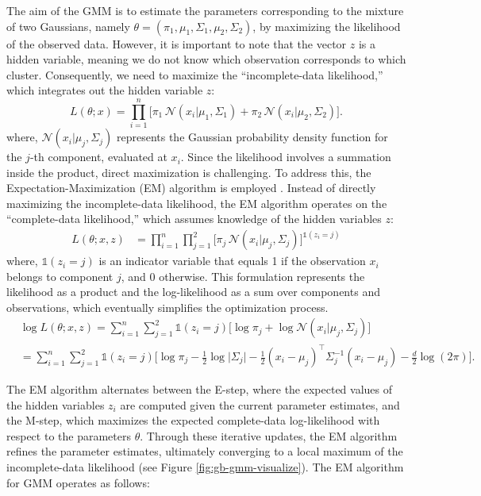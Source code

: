 The aim of the GMM is to estimate the parameters corresponding to the mixture of two Gaussians, namely $\theta = (\pi_1, \mu_1, \Sigma_1, \mu_2, \Sigma_2)$, by maximizing the likelihood of the observed data. However, it is important to note that the vector $z$ is a hidden variable, meaning we do not know which observation corresponds to which cluster. Consequently, we need to maximize the ``incomplete-data likelihood,'' which integrates out the hidden variable $z$:
\begin{equation}
    L(\theta; x) = \prod_{i=1}^n \Big[\pi_1 \, \mathcal{N}(x_i \vert \mu_1, \Sigma_1) + \pi_2 \, \mathcal{N}(x_i \vert \mu_2, \Sigma_2)\Big].
\end{equation}
where, $\mathcal{N}(x_i \vert \mu_j, \Sigma_j)$ represents the Gaussian probability density function for the $j$-th component, evaluated at $x_i$. Since the likelihood involves a summation inside the product, direct maximization is challenging. To address this, the Expectation-Maximization (EM) algorithm is employed \cite{dempster1977maximum}. Instead of directly maximizing the incomplete-data likelihood, the EM algorithm operates on the ``complete-data likelihood,'' which assumes knowledge of the hidden variables $z$:
\begin{align}
    L(\theta; x, z) &= \prod_{i=1}^n \prod_{j=1}^2 \Big[\pi_j \, \mathcal{N}(x_i \vert \mu_j, \Sigma_j)\Big]^{\mathds{1}(z_{i} = j)}
\label{eq:gmm_complete_data1}
\end{align}
where, $\mathds{1}(z_i = j)$ is an indicator variable that equals 1 if the observation $x_i$ belongs to component $j$, and 0 otherwise. This formulation represents the likelihood as a product and the log-likelihood as a sum over components and observations, which eventually simplifies the optimization process.
\begin{align}
    &\log L(\theta; x, z) = \sum_{i=1}^n \sum_{j=1}^2 \mathds{1}(z_{i} = j) 
    \Big[\log \pi_j + \log \mathcal{N}(x_i \vert \mu_j, \Sigma_j)\Big] \nonumber \\
    &= \sum_{i=1}^n \sum_{j=1}^2 \mathds{1}(z_{i} = j) 
    \Big[\log \pi_j - \frac{1}{2} \log \vert\Sigma_j\vert 
    - \frac{1}{2} (x_i - \mu_j)^\top \Sigma_j^{-1} (x_i - \mu_j) 
    - \frac{d}{2} \log(2\pi)\Big].
\label{eq:gmm_complete_data2}
\end{align}

The EM algorithm alternates between the E-step, where the expected values of the hidden variables $z_i$ are computed given the current parameter estimates, and the M-step, which maximizes the expected complete-data log-likelihood with respect to the parameters $\theta$. Through these iterative updates, the EM algorithm refines the parameter estimates, ultimately converging to a local maximum of the incomplete-data likelihood \cite{dempster1977maximum} (see Figure \ref{fig:gb-gmm-visualize}). The EM algorithm for GMM operates as follows: 

